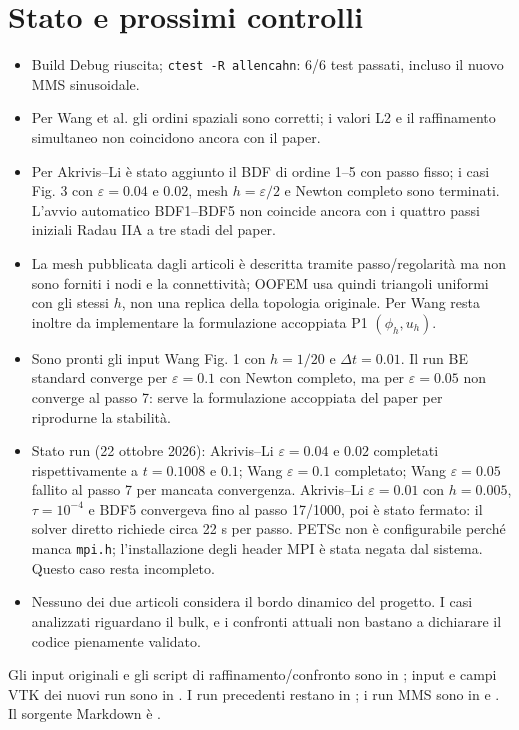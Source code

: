 \documentclass[10pt,a4paper]{article}
\begin{document}
\section{Stato e prossimi controlli}
\begin{itemize}
 \item Build Debug riuscita; \texttt{ctest -R allencahn}: 6/6 test passati, incluso il nuovo MMS sinusoidale.
 \item Per Wang et al. gli ordini spaziali sono corretti; i valori L2 e il raffinamento simultaneo non coincidono ancora con il paper.
\item Per Akrivis--Li è stato aggiunto il BDF di ordine 1--5 con passo fisso; i casi Fig. 3 con $\varepsilon=0.04$ e $0.02$, mesh $h=\varepsilon/2$ e Newton completo sono terminati. L’avvio automatico BDF1--BDF5 non coincide ancora con i quattro passi iniziali Radau IIA a tre stadi del paper.
\item La mesh pubblicata dagli articoli è descritta tramite passo/regolarità ma non sono forniti i nodi e la connettività; OOFEM usa quindi triangoli uniformi con gli stessi $h$, non una replica della topologia originale. Per Wang resta inoltre da implementare la formulazione accoppiata P1 $(\phi_h,u_h)$.
 \item Sono pronti gli input Wang Fig. 1 con $h=1/20$ e $\Delta t=0.01$. Il run BE standard converge per $\varepsilon=0.1$ con Newton completo, ma per $\varepsilon=0.05$ non converge al passo 7: serve la formulazione accoppiata del paper per riprodurne la stabilità.
 \item Stato run (22 ottobre 2026): Akrivis--Li $\varepsilon=0.04$ e $0.02$ completati rispettivamente a $t=0.1008$ e $0.1$; Wang $\varepsilon=0.1$ completato; Wang $\varepsilon=0.05$ fallito al passo 7 per mancata convergenza. Akrivis--Li $\varepsilon=0.01$ con $h=0.005$, $\tau=10^{-4}$ e BDF5 convergeva fino al passo 17/1000, poi è stato fermato: il solver diretto richiede circa 22 s per passo. PETSc non è configurabile perché manca \texttt{mpi.h}; l’installazione degli header MPI è stata negata dal sistema. Questo caso resta incompleto.
\item Nessuno dei due articoli considera il bordo dinamico del progetto. I casi analizzati riguardano il bulk, e i confronti attuali non bastano a dichiarare il codice pienamente validato.
\end{itemize}

Gli input originali e gli script di raffinamento/confronto sono in ; input e campi VTK dei nuovi run sono in . I run precedenti restano in ; i run MMS sono in  e . Il sorgente Markdown è .
\end{document}
